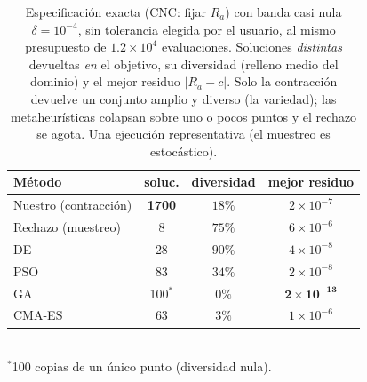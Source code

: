 \documentclass[5p,times,authoryear]{elsarticle}
\begin{document}
\begin{table}[t]
\centering
\caption{Especificación exacta (CNC: fijar $R_a$) con banda casi nula $\delta=10^{-4}$, sin
tolerancia elegida por el usuario, al mismo presupuesto de $1.2\times10^4$ evaluaciones.
Soluciones \emph{distintas} devueltas \emph{en} el objetivo, su diversidad (relleno medio del
dominio) y el mejor residuo $|R_a-c|$. Solo la contracción devuelve un conjunto amplio y
diverso (la variedad); las metaheurísticas colapsan sobre uno o pocos puntos y el rechazo se
agota. Una ejecución representativa (el muestreo es estocástico).}
\label{tab:exact}
\begin{tabular}{lccc}
\toprule
Método & soluc. & diversidad & mejor residuo \\
\midrule
Nuestro (contracción) & \textbf{1700} & $18\%$ & $2\times10^{-7}$ \\
Rechazo (muestreo)    & 8    & $75\%$ & $6\times10^{-6}$ \\
DE                    & 28   & $90\%$ & $4\times10^{-8}$ \\
PSO                   & 83   & $34\%$ & $2\times10^{-8}$ \\
GA                    & 100$^\ast$ & $0\%$  & $\mathbf{2\times10^{-13}}$ \\
CMA-ES                & 63   & $3\%$  & $1\times10^{-6}$ \\
\bottomrule
\end{tabular}\\[2pt]
{\footnotesize $^\ast$100 copias de un único punto (diversidad nula).}
\end{table}
\end{document}

